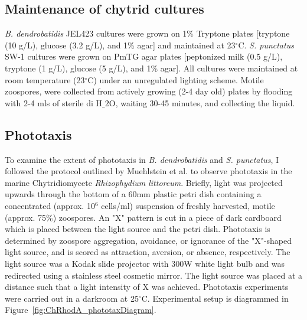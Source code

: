 \subsection*{Maintenance of chytrid cultures}
\textit{B. dendrobatidis} JEL423 cultures were grown on 1\% Tryptone plates [tryptone (10 g/L), glucose (3.2 g/L), and 1\% agar] and maintained at 23$^{\circ}$C. \textit{S. punctatus} SW-1 cultures were grown on PmTG agar plates [peptonized milk (0.5 g/L), tryptone (1 g/L), glucose (5 g/L), and 1\% agar]. All cultures were maintained at room temperature (23$^{\circ}$C) under an unregulated lighting scheme. Motile zoospores, were collected from actively growing (2-4 day old) plates by flooding with 2-4 mls of sterile di H$\_{2}$O, waiting 30-45 minutes, and collecting the liquid. \\
\subsection*{Phototaxis}
To examine the extent of phototaxis in \textit{B. dendrobatidis} and \textit{S. punctatus}, I followed the protocol outlined by Muehlstein et al.\nocite{Muehlstein1987} to observe phototaxis in the marine Chytridiomycete \textit{Rhizophydium littoreum}. Briefly, light was projected upwards through the bottom of a 60mm plastic petri dish containing a concentrated (approx. 10$^{6}$ cells/ml) suspension of freshly harvested, motile (approx. 75\%) zoospores. An "X" pattern is cut in a piece of dark cardboard which is placed between the light source and the petri dish. Phototaxis is determined by zoospore aggregation, avoidance, or ignorance of the "X"-shaped light source, and is scored as attraction, aversion, or absence, respectively. The light source was a Kodak slide projector with 300W white light bulb and was redirected using a stainless steel cosmetic mirror. The light source was placed at a distance such that a light intensity of X was achieved. Phototaxis experiments were carried out in a darkroom at 25$^{\circ}$C. Experimental setup is diagrammed in Figure~\ref{fig:ChRhodA_phototaxDiagram}.\\ 
